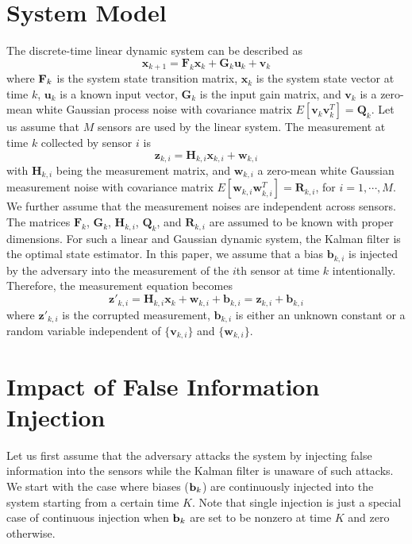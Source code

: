 \documentclass{article}
\begin{document}
\section{System Model}
\label{sec:sysmodel}
The discrete-time linear dynamic system can be described as 
\begin{equation}
	\label{eq:plant}
	\mathbf{x}_{k+1} = \mathbf{F}_{k} \mathbf{x}_{k} + \mathbf{G}_{k} \mathbf{u}_{k} + \mathbf{v}_{k}
\end{equation}
where ${\bf F}_{k}$ is the system state transition matrix, $\mathbf{x}_{k}$ is the system state vector at time $k$, $\mathbf{u}_{k}$ is a known input vector, $\mathbf{G}_{k}$ is the input gain matrix, and $\mathbf{v}_{k}$ is a zero-mean white Gaussian process noise with covariance matrix $E[\mathbf{v}_{k}\mathbf{v}_{k}^T] = \mathbf{Q}_{k}$. Let us assume that $M$ sensors are used by the linear system. The measurement at time $k$ collected by sensor $i$ is
\begin{equation}
	\label{eq:measure1}
	\mathbf{z}_{k,i} = \mathbf{H}_{k,i} \mathbf{x}_{k,i} + \mathbf{w}_{k,i}
\end{equation}
 with $\mathbf{H}_{k,i}$ being the measurement matrix, and $\mathbf{w}_{k,i}$ a zero-mean white Gaussian measurement noise with covariance matrix $ E[\mathbf{w}_{k,i} \mathbf{w}_{k,i}^T] = \mathbf{R}_{k,i}$, for $i=1,\cdots, M$. We further assume that the measurement noises are independent across sensors. The matrices $\mathbf{F}_{k}$, $\mathbf{G}_{k}$, $\mathbf{H}_{k,i}$, $\mathbf{Q}_{k}$, and $\mathbf{R}_{k,i}$ are assumed to be known with proper dimensions.
For such a linear and Gaussian dynamic system, the Kalman filter is the optimal state estimator. In this paper, we assume that a bias $\mathbf{b}_{k,i}$ is injected by the adversary into the measurement of the $i$th  sensor at time $k$ intentionally. Therefore, the measurement equation  becomes
\begin{equation}
	\label{eq:measure2}
	\mathbf{z}'_{k,i} = \mathbf{H}_{k,i} \mathbf{x}_{k} + \mathbf{w}_{k,i} +\mathbf{b}_{k,i}=\mathbf{z}_{k,i}+\mathbf{b}_{k,i}
\end{equation}  
where $\mathbf{z}'_{k,i}$ is the corrupted measurement, $\mathbf{b}_{k,i}$ is either an unknown constant or a random variable independent of $\{\mathbf{v}_{k,i}\}$ and $\{\mathbf{w}_{k,i}\}$. 

\section{Impact of False Information Injection}
\label{sec:impact}
Let us first assume that the adversary attacks the system by injecting false information into the sensors while the Kalman filter is unaware of such attacks. We start with the case where biases (${\bf b}_k$) are continuously injected into the system starting from a certain time $K$. Note that single injection is just a special case of continuous injection when ${\bf b}_k$ are set to be nonzero at time $K$ and zero otherwise.
\end{document}
